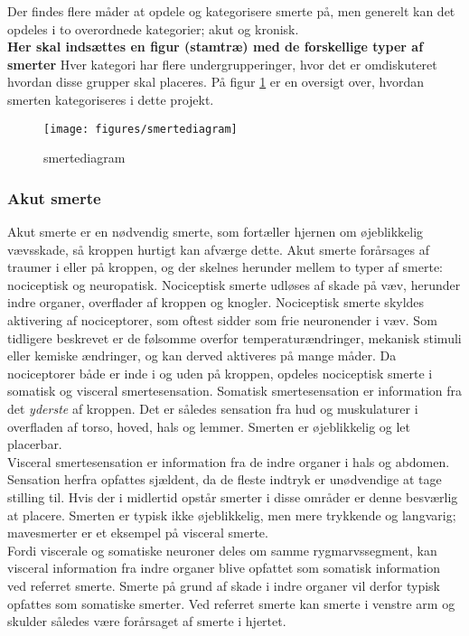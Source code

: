 Der findes flere måder at opdele og kategorisere smerte på, men generelt kan det opdeles i to overordnede kategorier; akut og kronisk. \\
\textbf{Her skal indsættes en figur (stamtræ) med de forskellige typer af smerter} 
Hver kategori har flere undergrupperinger, hvor det er omdiskuteret hvordan disse grupper skal placeres. \citep{Giangragorio1997} På figur \ref{smertediagram} er en oversigt over, hvordan smerten kategoriseres i dette projekt.

\begin{figure}[H]
	\caption{smertediagram}
	\label{smertediagram}
	\centering
	\texttt{[image: figures/smertediagram]}
	\flushleft
\end{figure}

\subsubsection{Akut smerte}
Akut smerte er en nødvendig smerte, som fortæller hjernen om øjeblikkelig vævsskade, så kroppen hurtigt kan afværge dette. Akut smerte forårsages af traumer i eller på kroppen, og der skelnes herunder mellem to typer af smerte: nociceptisk og neuropatisk. Nociceptisk smerte udløses af skade på væv, herunder indre organer, overflader af kroppen og knogler. Nociceptisk smerte skyldes aktivering af nociceptorer, som oftest sidder som frie neuronender i væv. Som tidligere beskrevet er de følsomme overfor temperaturændringer, mekanisk stimuli eller kemiske ændringer, og kan derved aktiveres på mange måder. Da nociceptorer både er inde i og uden på kroppen, opdeles nociceptisk smerte i somatisk og visceral smertesensation. Somatisk smertesensation er information fra det \textit{yderste} af kroppen. Det er således sensation fra hud og muskulaturer i overfladen af torso, hoved, hals og lemmer. \citep{Martini} Smerten er øjeblikkelig og let placerbar. \\
Visceral smertesensation er information fra de indre organer i hals og abdomen. Sensation herfra opfattes sjældent, da de fleste indtryk er unødvendige at tage stilling til. Hvis der i midlertid opstår smerter i disse områder er denne besværlig at placere. Smerten er typisk ikke øjeblikkelig, men mere trykkende og langvarig; mavesmerter er et eksempel på visceral smerte. \\
Fordi viscerale og somatiske neuroner deles om samme rygmarvssegment, kan visceral information fra indre organer blive opfattet som somatisk information ved referret smerte. Smerte på grund af skade i indre organer vil derfor typisk opfattes som somatiske smerter. Ved referret smerte kan smerte i venstre arm og skulder således være forårsaget af smerte i hjertet.

